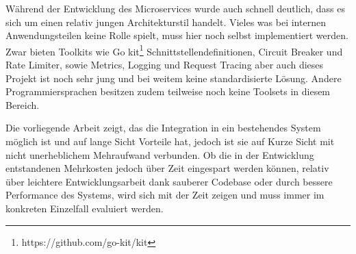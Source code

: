 Während der Entwicklung des Microservices wurde auch schnell deutlich, dass es sich um einen relativ jungen Architekturstil handelt. Vieles was bei internen Anwendungsteilen keine Rolle spielt, muss hier noch selbst implementiert werden. Zwar bieten Toolkits wie Go kit\footnote{https://github.com/go-kit/kit} Schnittstellendefinitionen, Circuit Breaker und Rate Limiter, sowie Metrics, Logging und Request Tracing aber auch dieses Projekt ist noch sehr jung und bei weitem keine standardisierte Lösung. Andere Programmiersprachen besitzen zudem teilweise noch keine Toolsets in diesem Bereich.

Die vorliegende Arbeit zeigt, das die Integration in ein bestehendes System möglich ist und auf lange Sicht Vorteile hat, jedoch ist sie auf Kurze Sicht mit nicht unerheblichem Mehraufwand verbunden. Ob die in der Entwicklung entstandenen Mehrkosten jedoch über Zeit eingespart werden können, relativ über leichtere Entwicklungsarbeit dank sauberer Codebase oder durch bessere Performance des Systems, wird sich mit der Zeit zeigen und muss immer im konkreten Einzelfall evaluiert werden.